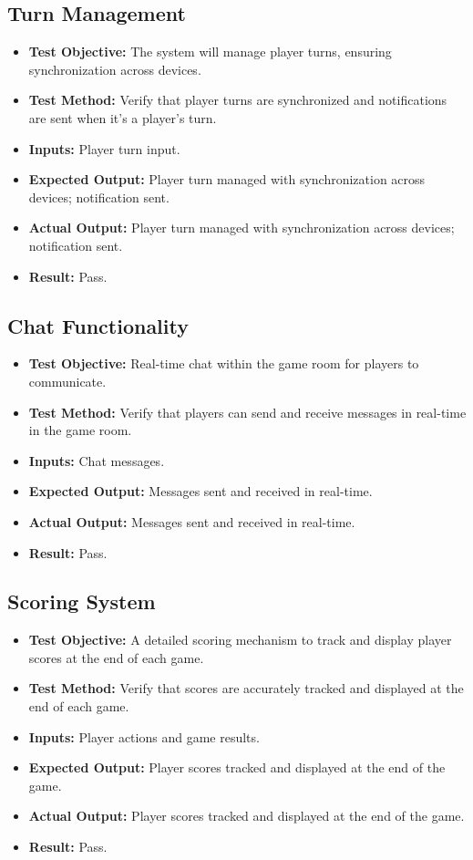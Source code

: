 \documentclass[12pt, titlepage]{article}
\begin{document}
\subsection{Turn Management}
\begin{itemize}
    \item \textbf{Test Objective:} The system will manage player turns, ensuring synchronization across devices.
    \item \textbf{Test Method:} Verify that player turns are synchronized and notifications are sent when it's a player's turn.
    \item \textbf{Inputs:} Player turn input.
    \item \textbf{Expected Output:} Player turn managed with synchronization across devices; notification sent.
    \item \textbf{Actual Output:} Player turn managed with synchronization across devices; notification sent.
    \item \textbf{Result:} Pass.
\end{itemize}

\subsection{Chat Functionality}
\begin{itemize}
    \item \textbf{Test Objective:} Real-time chat within the game room for players to communicate.
    \item \textbf{Test Method:} Verify that players can send and receive messages in real-time in the game room.
    \item \textbf{Inputs:} Chat messages.
    \item \textbf{Expected Output:} Messages sent and received in real-time.
    \item \textbf{Actual Output:} Messages sent and received in real-time.
    \item \textbf{Result:} Pass.
\end{itemize}

\subsection{Scoring System}
\begin{itemize}
    \item \textbf{Test Objective:} A detailed scoring mechanism to track and display player scores at the end of each game.
    \item \textbf{Test Method:} Verify that scores are accurately tracked and displayed at the end of each game.
    \item \textbf{Inputs:} Player actions and game results.
    \item \textbf{Expected Output:} Player scores tracked and displayed at the end of the game.
    \item \textbf{Actual Output:} Player scores tracked and displayed at the end of the game.
    \item \textbf{Result:} Pass.
\end{itemize}
\end{document}
